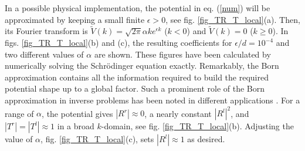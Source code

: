 In a possible physical implementation, the potential in eq. (\ref{num}) will
be approximated by keeping a small finite $\epsilon>0$, see fig. \ref{fig_TR_T_local}(a).
Then, its Fourier transform is
$\widetilde V(k) = \sqrt{2\pi} \alpha k e^{\epsilon k}$ ($k < 0$) and $\widetilde V(k)=0$ ($k \ge 0$).
In figs. \ref{fig_TR_T_local}(b) and (c), the resulting coefficients for $\epsilon/d=10^{-4}$ and  two different values
of $\alpha$ are shown.  These figures have been calculated by
numerically solving the Schr\"odinger equation exactly.
Remarkably, the Born approximation contains all the information required to build the required potential shape
up to a global factor.  Such a prominent role of the Born approximation in inverse problems has been noted
in different applications \cite{Snieder1990,Mostafazadeh2014,Horsley2015}. For a range of $\alpha$, the potential gives $|R^r|\approx 0$, a nearly constant $|R^l|^2$, and
$|T^r|= |T^l|\approx1$  in a broad $k$-domain, see fig. \ref{fig_TR_T_local}(b). Adjusting  the value of $\alpha$, fig. \ref{fig_TR_T_local}(c),
sets $|R^l|\approx 1$ as desired.
%

%
%
%
%
%
